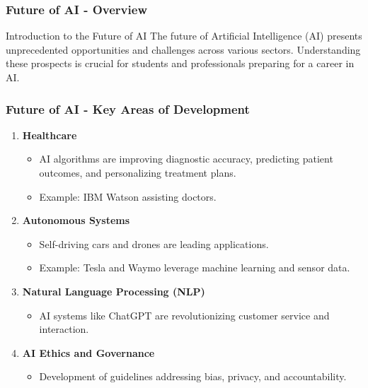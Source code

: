 \documentclass{beamer}
\begin{document}
\begin{frame}[fragile]
    \frametitle{Future of AI - Overview}
    \begin{block}{Introduction to the Future of AI}
        The future of Artificial Intelligence (AI) presents unprecedented opportunities and challenges across various sectors.
        Understanding these prospects is crucial for students and professionals preparing for a career in AI.
    \end{block}
\end{frame}

\begin{frame}[fragile]
    \frametitle{Future of AI - Key Areas of Development}
    \begin{enumerate}
        \item \textbf{Healthcare}
            \begin{itemize}
                \item AI algorithms are improving diagnostic accuracy, predicting patient outcomes, and personalizing treatment plans.
                \item Example: IBM Watson assisting doctors.
            \end{itemize}

        \item \textbf{Autonomous Systems}
            \begin{itemize}
                \item Self-driving cars and drones are leading applications.
                \item Example: Tesla and Waymo leverage machine learning and sensor data.
            \end{itemize}
        
        \item \textbf{Natural Language Processing (NLP)}
            \begin{itemize}
                \item AI systems like ChatGPT are revolutionizing customer service and interaction.
            \end{itemize}
        
        \item \textbf{AI Ethics and Governance}
            \begin{itemize}
                \item Development of guidelines addressing bias, privacy, and accountability.
            \end{itemize}
    \end{enumerate}
\end{frame}
\end{document}
